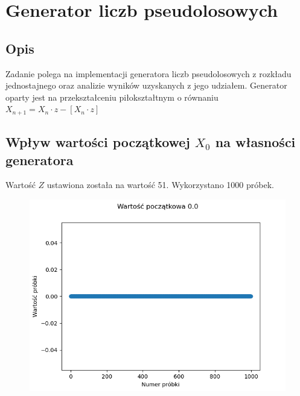 \documentclass[12pt,a4paper]{article}
\begin{document}
\pdfpageheight   297mm
\pdfpagewidth    210mm

\StronaTytulowa
\SpisTresci

\pagebreak


\section{Generator liczb pseudolosowych}
  \subsection{Opis}
  Zadanie polega na implementacji generatora liczb pseudolosowych z rozkładu jednostajnego oraz analizie wyników uzyskanych z jego udziałem. Generator oparty jest na przekształceniu piłokształtnym o równaniu $X_{n+1} = X_n \cdot z - [X_n \cdot z]$ 

  \subsection{Wpływ wartości początkowej $X_0$ na własności generatora}

  Wartość $Z$ ustawiona została na wartość 51. Wykorzystano 1000 próbek.

  \begin{figure}[H]
    \centering
    \includegraphics[height=0.3\textheight]{figures/Figure_1.png}
    \label{fig:1}
  \end{figure}
\end{document}
